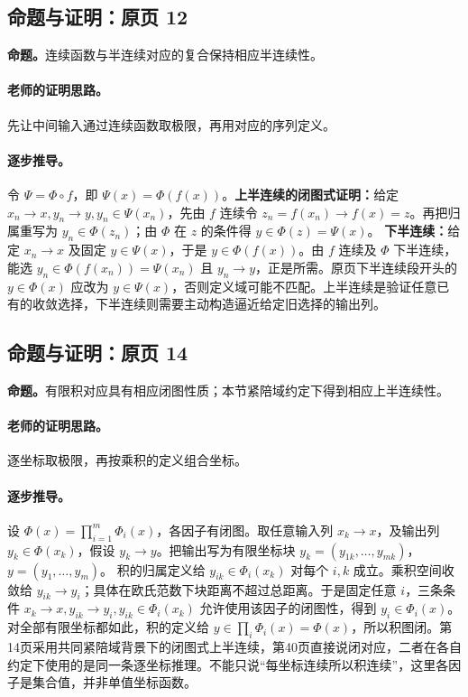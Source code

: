 \documentclass[11pt,a4paper]{article}
\theoremstyle{definition}\newtheorem{definition}{定义}\newtheorem{example}{例}
\begin{document}
\subsection{命题与证明：原页 12}

\textbf{命题。}连续函数与半连续对应的复合保持相应半连续性。

\paragraph{老师的证明思路。}先让中间输入通过连续函数取极限，再用对应的序列定义。

\paragraph{逐步推导。}令 $\Psi=\Phi\circ f$，即 $\Psi(x)=\Phi(f(x))$。\textbf{上半连续的闭图式证明：}给定 $x_n\to x,y_n\to y,y_n\in\Psi(x_n)$，先由 $f$ 连续令 $z_n=f(x_n)\to f(x)=z$。再把归属重写为 $y_n\in\Phi(z_n)$；由 $\Phi$ 在 $z$ 的条件得 $y\in\Phi(z)=\Psi(x)$。
\textbf{下半连续：}给定 $x_n\to x$ 及固定 $y\in\Psi(x)$，于是 $y\in\Phi(f(x))$。由 $f$ 连续及 $\Phi$ 下半连续，能选 $y_n\in\Phi(f(x_n))=\Psi(x_n)$ 且 $y_n\to y$，正是所需。原页下半连续段开头的 $y\in\Phi(x)$ 应改为 $y\in\Psi(x)$，否则定义域可能不匹配。上半连续是验证任意已有的收敛选择，下半连续则需要主动构造逼近给定旧选择的输出列。

\subsection{命题与证明：原页 14}

\textbf{命题。}有限积对应具有相应闭图性质；本节紧陪域约定下得到相应上半连续性。

\paragraph{老师的证明思路。}逐坐标取极限，再按乘积的定义组合坐标。

\paragraph{逐步推导。}
设 $\Phi(x)=\prod_{i=1}^m\Phi_i(x)$，各因子有闭图。取任意输入列 $x_k\to x$，及输出列 $y_k\in\Phi(x_k)$，假设 $y_k\to y$。把输出写为有限坐标块 $y_k=(y_{1k},\ldots,y_{mk})$，$y=(y_1,\ldots,y_m)$。
积的归属定义给 $y_{ik}\in\Phi_i(x_k)$ 对每个 $i,k$ 成立。乘积空间收敛给 $y_{ik}\to y_i$；具体在欧氏范数下块距离不超过总距离。于是固定任意 $i$，三条条件 $x_k\to x,y_{ik}\to y_i,y_{ik}\in\Phi_i(x_k)$ 允许使用该因子的闭图性，得到 $y_i\in\Phi_i(x)$。
对全部有限坐标都如此，积的定义给 $y\in\prod_i\Phi_i(x)=\Phi(x)$，所以积图闭。第14页采用共同紧陪域背景下的闭图式上半连续，第40页直接说闭对应，二者在各自约定下使用的是同一条逐坐标推理。不能只说“每坐标连续所以积连续”，这里各因子是集合值，并非单值坐标函数。
\end{document}
